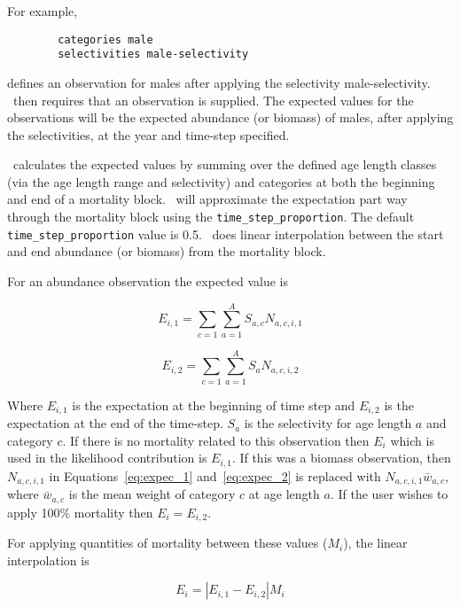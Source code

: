 For example,

{\small{\begin{verbatim}
		categories male
		selectivities male-selectivity
\end{verbatim}}}

defines an observation for males after applying the selectivity male-selectivity. \CNAME\ then requires that an observation is supplied. The expected values for the observations will be the expected abundance (or biomass) of males, after applying the selectivities, at the year and time-step specified.

\CNAME\ calculates the expected values by summing over the defined \ifAgeBased age \else length \fi classes (via the \ifAgeBased age \else length \fi range and selectivity) and categories at both the beginning and end of a mortality block. \CNAME\ will approximate the expectation part way through the mortality block using the \texttt{time\_step\_proportion}. The default \texttt{time\_step\_proportion} value is 0.5. \CNAME\ does linear interpolation between the start and end abundance (or biomass) from the mortality block.

For an abundance observation the expected value is

\begin{equation}\label{eq:expec_1}
E_{i,1} = \sum_{c=1}^{} \sum_{a=1}^{A} S_{a,c} N_{a,c,i,1}
\end{equation}

\begin{equation}\label{eq:expec_2}
E_{i,2} = \sum_{c=1}^{} \sum_{a=1}^{A} S_a N_{a,c,i,2}
\end{equation}

Where $E_{i,1}$ is the expectation at the beginning of time step and $E_{i,2}$ is the expectation at the end of the time-step. $S_a$ is the selectivity for \ifAgeBased age \else length \fi $a$ and category $c$. If there is no mortality related to this observation then $E_i$ which is used in the likelihood contribution is $E_{i,1}$. If this was a biomass observation, then $N_{a,c,i,1}$ in Equations~\eqref{eq:expec_1} and~\eqref{eq:expec_2} is replaced with $N_{a,c,i,1} \bar{w}_{a,c}$, where $\bar{w}_{a,c}$ is the mean weight of category $c$ at \ifAgeBased age \else length \fi $a$. If the user wishes to apply 100\% mortality then $E_i = E_{i,2}$.

For applying quantities of mortality between these values ($M_i$), the linear interpolation is

\begin{equation}
E_{i} = |E_{i,1} - E_{i,2}|  M_i
\end{equation}

